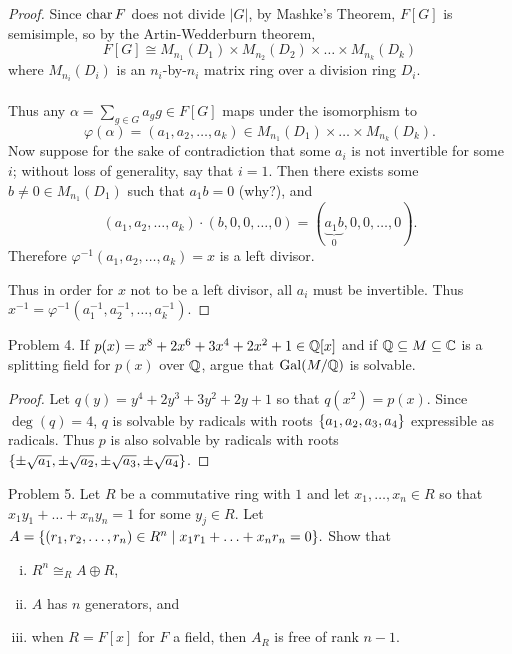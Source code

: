 \documentclass{article}
\begin{document}
\begin{proof}
  Since $\operatorname{char} F$ does not divide $|G|$, by Mashke's Theorem, $F[G]$ is semisimple, so by the Artin-Wedderburn theorem, \[
    F[G] \cong M_{n_1}(D_1) \times M_{n_2}(D_2) \times \hdots \times M_{n_k}(D_k)
  \] where $M_{n_i}(D_i)$ is an $n_i$-by-$n_i$ matrix ring over a division ring
  $D_i$.
  \\~\\
  Thus any $\alpha = \sum_{g \in G} a_gg \in F[G]$ maps under the isomorphism to \[
    \varphi(\alpha) = (a_1, a_2, \hdots, a_k) \in M_{n_1}(D_1) \times \hdots \times M_{n_k}(D_k).
  \]
  Now suppose for the sake of contradiction that some $a_i$ is not invertible for
  some $i$; without loss of generality, say that $i=1$.
  Then there exists some $b \neq 0 \in M_{n_1}(D_1)$ such that $a_1b = 0$ (why?),
  and \[
    (a_1, a_2, \hdots, a_k)\cdot(b, 0, 0, \hdots, 0) = (\underbrace{a_1b}_0, 0, 0, \hdots, 0).
  \] Therefore $\varphi^{-1}(a_1, a_2, \hdots, a_k) = x$ is a left divisor.

  Thus in order for $x$ not to be a left divisor, all $a_i$ must be invertible.
  Thus $x^{-1} = \varphi^{-1}(a_1^{-1}, a_2^{-1}, \hdots, a_k^{-1})$.
\end{proof}
\pagebreak

\begin{subsection}{Problem 4.}
  If $p(x) = x^8 + 2x^6 + 3x^4 + 2x^2 + 1 \in \mathbb Q[x]$ and if
  $\mathbb Q \subseteq M \subseteq \mathbb C$ is a splitting field for $p(x)$ over $\mathbb Q$,
  argue that $\operatorname{Gal}(M/\mathbb Q)$ is solvable.
\end{subsection}

\begin{proof}
  Let $q(y) = y^4 + 2y^3 + 3y^2 + 2y + 1$ so that $q(x^2) = p(x)$. Since
  $\deg(q) = 4$, $q$ is solvable by radicals with roots
  $\{a_1, a_2, a_3, a_4\}$ expressible as radicals. Thus $p$ is also solvable
  by radicals with roots
  $\{\pm\sqrt{a_1}, \pm\sqrt{a_2}, \pm\sqrt{a_3}, \pm\sqrt{a_4}\}$.
\end{proof}
\pagebreak

\begin{subsection}{Problem 5.}
  Let $R$ be a commutative ring with $1$ and let $x_1, \hdots, x_n \in R$
  so that $x_1y_1 + \hdots + x_ny_n = 1$ for some $y_j \in R$. Let
  $A = \{(r_1, r_2, \hdots, r_n) \in R^n \mid x_1r_1 + \hdots + x_nr_n = 0\}.$
  Show that \begin{enumerate}[(i)]
    \item $R^n \cong_R A \oplus R$,
    \item $A$ has $n$ generators, and
    \item when $R = F[x]$ for $F$ a field, then $A_R$ is free of rank $n-1$.
  \end{enumerate}
\end{subsection}
\end{document}
